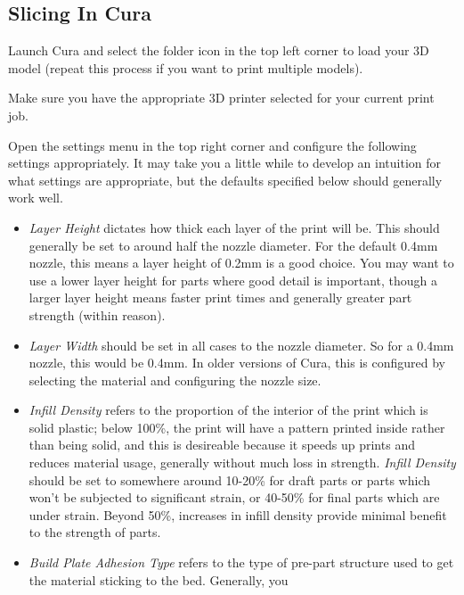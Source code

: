 \documentclass[12pt]{report}
\begin{document}
\subsection*{Slicing In Cura}
\label{sec:slicing}

Launch Cura and select the folder icon in the top left corner to load your 3D
model (repeat this process if you want to print multiple models). \par
Make sure you have the appropriate 3D printer selected for your current print
job. \par
Open the settings menu in the top right corner and configure the following
settings appropriately. It may take you a little while to develop an intuition
for what settings are appropriate, but the defaults specified below should
generally work well.

\begin{itemize}
    \item \textit{Layer Height} dictates how thick each layer of the print will
        be. This should generally be set to around half the
        nozzle diameter. For the default 0.4mm nozzle, this means a layer height
        of 0.2mm is a good choice. You may want to use a lower layer height for
        parts where good detail is important, though a larger layer height means
        faster print times and generally greater part strength (within reason).
    \item \textit{Layer Width} should be set in all cases to the nozzle
        diameter. So for a 0.4mm nozzle, this would be 0.4mm. In older versions
        of Cura, this is configured by selecting the material and configuring
        the nozzle size.
    \item \textit{Infill Density} refers to the proportion of the interior of
        the print which is solid plastic; below 100\%, the print will have a
        pattern printed inside rather than being solid, and this is desireable
        because it speeds up prints and reduces material usage, generally
        without much loss in strength. \textit{Infill Density} should be set
        to somewhere around 10-20\% for draft parts or parts which won't be
        subjected to significant strain, or 40-50\% for final parts which are
        under strain. Beyond 50\%, increases in infill density provide minimal
        benefit to the strength of parts.
    \item \textit{Build Plate Adhesion Type} refers to the type of pre-part
        structure used to get the material sticking to the bed. Generally, you

\end{itemize}
\end{document}
